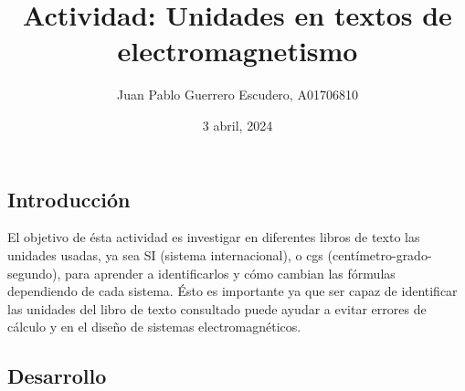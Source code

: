 \documentclass[12pt, letterpaper]{report}
\title{Actividad: Unidades en textos de electromagnetismo}
\author{Juan Pablo Guerrero Escudero, A01706810}
\date{3 abril, 2024}
\begin{document}
\maketitle
\subsection*{Introducción}
El objetivo de ésta actividad es investigar en diferentes libros de texto las unidades usadas, ya sea SI (sistema internacional), o 
cgs (centímetro-grado-segundo), para aprender a identificarlos y cómo cambian las fórmulas dependiendo de cada sistema. Ésto es importante 
ya que ser capaz de identificar las unidades del libro de texto consultado puede ayudar a evitar errores de cálculo y en el diseño de sistemas 
electromagnéticos.  
\subsection*{Desarrollo}
\end{document}
